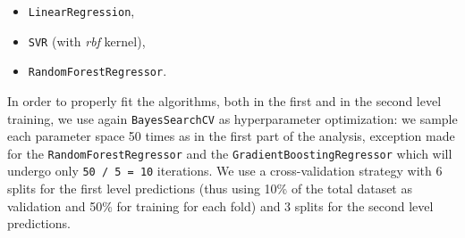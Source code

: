     \begin{itemize}
        \item \texttt{LinearRegression},
        \item \texttt{SVR} (with \textit{rbf} kernel),
        \item \texttt{RandomForestRegressor}.
    \end{itemize}
    In order to properly fit the algorithms, both in the first and in the second level training, we use again \texttt{BayesSearchCV} as hyperparameter optimization: we sample each parameter space 50 times as in the first part of the analysis, exception made for the \texttt{RandomForestRegressor} and the \texttt{GradientBoostingRegressor} which will undergo only \texttt{50 / 5 = 10} iterations. We use a cross-validation strategy with 6 splits for the first level predictions (thus using 10\% of the total dataset as validation and 50\% for training for each fold) and 3 splits for the second level predictions.